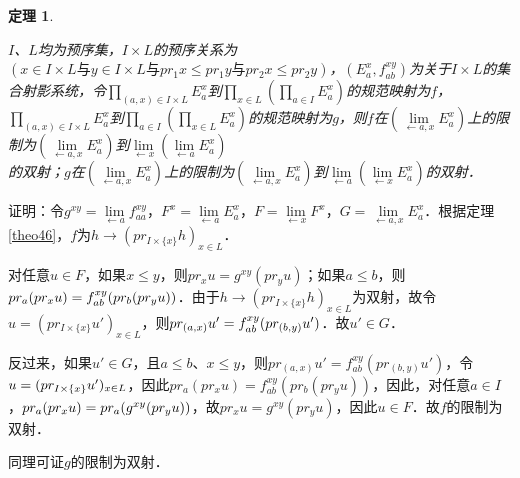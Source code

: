 \documentclass[12pt, a4paper, oneside]{book}
\newtheorem{theo}{定理}
\begin{document}
			\begin{theo}\label{theo178}
				\hfill\par
				$I$、$L$均为预序集，$I\times L$的预序关系为$(x\in I\times L\text{与}y\in I\times L\text{与}pr_1x\leq pr_1y\text{与}pr_2x\leq pr_2y)$，$(E_a^x, f_{ab}^{xy})$为关于$I\times L$的集合射影系统，令$\prod\limits_{(a, x)\in I\times L}E_a^x$到$\prod\limits_{x\in L}(\prod\limits_{a\in I}E_a^x)$的规范映射为$f$，$\prod\limits_{(a, x)\in I\times L}E_a^x$到$\prod\limits_{a\in I}(\prod\limits_{x\in L}E_a^x)$的规范映射为$g$，则$f$在$(\lim\limits_{\gets a, x}E_a^x)$上的限制为$(\lim\limits_{\gets a, x}E_a^x)$到$\lim\limits_{\gets x}(\lim\limits_{\gets a}E_a^x)$\\的双射；$g$在$(\lim\limits_{\gets a, x}E_a^x)$上的限制为$(\lim\limits_{\gets a, x}E_a^x)$到$\lim\limits_{\gets a}(\lim\limits_{\gets x}E_a^x)$的双射．
			\end{theo}
			证明：令$g^{xy}= \lim\limits_{\gets a}f_{aa}^{xy}$，$F^x=\lim\limits_{\gets a}E_a^x$，$F= \lim\limits_{\gets x}F^x$，$G=\lim\limits_{\gets a, x}E_a^x$．根据定理\ref{theo46}，$f$为$h\to (pr_{I\times \{x\}}h)_{x\in L}$．
			\par
			对任意$u\in F$，如果$x\leq y$，则$pr_xu=g^{xy}(pr_yu)$；如果$a\leq b$，则$pr_a(pr_xu)=\\f_{ab}^{xy}(pr_b(pr_yu))$．由于$h\to (pr_{I\times \{x\}}h)_{x\in L}$为双射，故令$u=(pr_{I\times \{x\}}u')_{x\in L}$，则$pr_{(a, x)}u'=\\f_{ab}^{xy}(pr_{(b, y)}u')$．故$u'\in G$．
			\par
			反过来，如果$u'\in G$，且$a\leq b$、$x\leq y$，则$pr_{(a, x)}u'=f_{ab}^{xy}(pr_{(b, y)}u')$，令$u=\\(pr_{I\times \{x\}}u')_{x\in L}$，因此$pr_a(pr_xu)=f_{ab}^{xy}(pr_b(pr_yu))$，因此，对任意$a\in I$，$pr_a(pr_xu)=\\pr_a(g^{xy}(pr_yu))$，故$pr_xu= g^{xy}(pr_yu)$，因此$u\in F$．故$f$的限制为双射．
			\par
			同理可证$g$的限制为双射．
			
\end{document}

